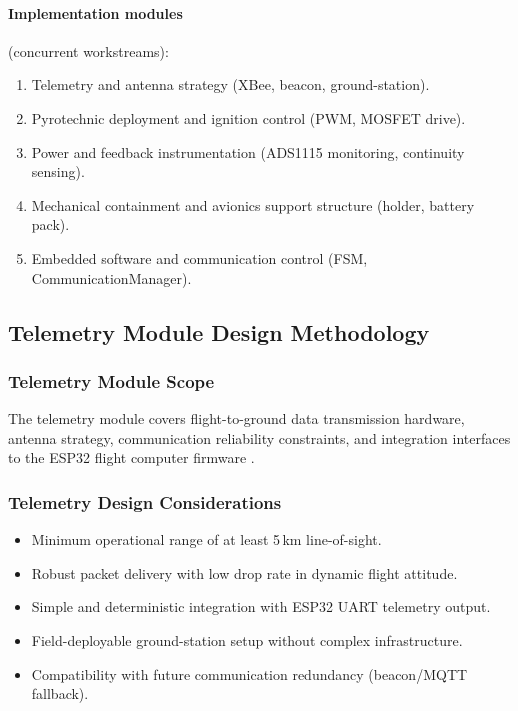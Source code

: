 \paragraph{Implementation modules} (concurrent workstreams):
\begin{enumerate}[leftmargin=*]
  \item Telemetry and antenna strategy (XBee, beacon, ground-station).
  \item Pyrotechnic deployment and ignition control (PWM, MOSFET drive).
  \item Power and feedback instrumentation (ADS1115 monitoring, continuity
    sensing).
  \item Mechanical containment and avionics support structure (holder, battery
    pack).
  \item Embedded software and communication control (FSM, CommunicationManager).
\end{enumerate}

\subsection{Telemetry Module Design Methodology}

\subsubsection{Telemetry Module Scope}

The telemetry module covers flight-to-ground data transmission hardware, antenna
strategy, communication reliability constraints, and integration interfaces to the
ESP32 flight computer firmware \cite{xbee_manual,n4_comm_architecture,n4_xbee_integration}.

\subsubsection{Telemetry Design Considerations}

\begin{itemize}
  \item Minimum operational range of at least 5\,km line-of-sight.
  \item Robust packet delivery with low drop rate in dynamic flight attitude.
  \item Simple and deterministic integration with ESP32 UART telemetry output.
  \item Field-deployable ground-station setup without complex infrastructure.
  \item Compatibility with future communication redundancy (beacon/MQTT fallback).
\end{itemize}


